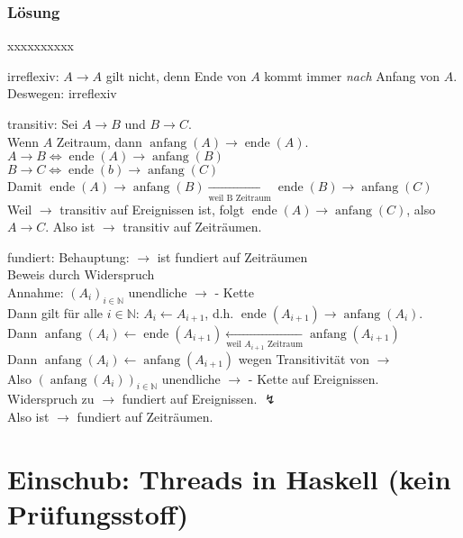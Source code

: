 \documentclass[a4paper]{scrartcl}
\DeclareMathOperator{\zanf}{anfang}
\DeclareMathOperator{\zend}{ende}
\begin{document}
\subsubsection*{Lösung}
\begin{labeling}{xxxxxxxxxx}
	\item[irreflexiv:] $ A \rightarrow A $ gilt nicht, denn Ende von $ A $ kommt immer \emph{nach} Anfang von $ A $. Deswegen: irreflexiv
	\item[transitiv:] Sei $ A \rightarrow B $ und $ B \rightarrow C $.\\
	Wenn $ A $ Zeitraum, dann $ \zanf(A) \rightarrow \zend(A) $.\\
	$ A \rightarrow B \Leftrightarrow \zend(A) \rightarrow \zanf(B) $\\
	$ B \rightarrow C \Leftrightarrow \zend(b) \rightarrow \zanf(C) $\\
	Damit $ \zend(A) \rightarrow \zanf(B) \underset{\text{weil B Zeitraum}}{\longrightarrow} \zend(B) \rightarrow \zanf(C) $\\
	Weil $ \rightarrow $ transitiv auf Ereignissen ist, folgt $ \zend(A) \rightarrow \zanf(C) $, also $ A \rightarrow C $. Also ist $ \rightarrow $ transitiv auf Zeiträumen.
	\item[fundiert:] Behauptung: $ \rightarrow $ ist fundiert auf Zeiträumen\\
	Beweis durch Widerspruch\\
	Annahme: $ \left(A_i\right)_{i \in \mathbb{N}} $ unendliche $ \rightarrow $ - Kette\\
	Dann gilt für alle $ i \in \mathbb{N} $: $ A_i \leftarrow A_{i + 1} $, d.h. $ \zend(A_{i + 1}) \rightarrow \zanf(A_i) $.\\
	Dann $ \zanf(A_i) \leftarrow \zend(A_{i + 1}) \underset{\text{weil } A_{i + 1} \text{ Zeitraum}}{\leftarrow} \zanf(A_{i + 1}) $\\
	Dann $ \zanf(A_i) \leftarrow \zanf(A_{i + 1}) $ wegen Transitivität von $ \rightarrow $\\
	Also $ \left(\zanf(A_i)\right)_{i \in \mathbb{N}} $ unendliche $ \rightarrow $ - Kette auf Ereignissen.\\
	Widerspruch zu $ \rightarrow $ fundiert auf Ereignissen. $ \lightning $\\
	Also ist $ \rightarrow $ fundiert auf Zeiträumen.
\end{labeling}

\section{Einschub: Threads in Haskell (kein Prüfungsstoff)}

\end{document}
